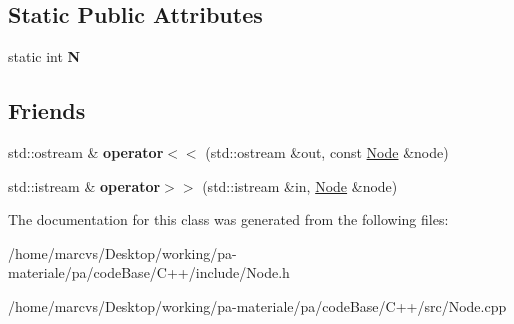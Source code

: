 \subsection*{Static Public Attributes}
\begin{DoxyCompactItemize}
\item 
\hypertarget{classNode_acd052a324caaa2fa0ab5aff9ab0205f7}{
static int {\bfseries N}}
\label{classNode_acd052a324caaa2fa0ab5aff9ab0205f7}

\end{DoxyCompactItemize}
\subsection*{Friends}
\begin{DoxyCompactItemize}
\item 
\hypertarget{classNode_a8f66b39225eb98c6161e1339eb398e5e}{
std::ostream \& {\bfseries operator$<$$<$} (std::ostream \&out, const \hyperlink{classNode}{Node} \&node)}
\label{classNode_a8f66b39225eb98c6161e1339eb398e5e}

\item 
\hypertarget{classNode_aff91a3b012a8d4c18b2c7011e49d33b0}{
std::istream \& {\bfseries operator$>$$>$} (std::istream \&in, \hyperlink{classNode}{Node} \&node)}
\label{classNode_aff91a3b012a8d4c18b2c7011e49d33b0}

\end{DoxyCompactItemize}


The documentation for this class was generated from the following files:\begin{DoxyCompactItemize}
\item 
/home/marcvs/Desktop/working/pa-\/materiale/pa/codeBase/C++/include/Node.h\item 
/home/marcvs/Desktop/working/pa-\/materiale/pa/codeBase/C++/src/Node.cpp\end{DoxyCompactItemize}
